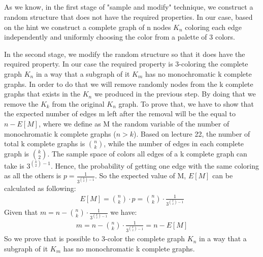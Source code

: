 \documentclass[11pt]{537homework}
\begin{document}
\subsection{} 
As we know, in the first stage of "sample and modify" technique, we construct a random structure that does not have the required properties. In our case, based on the hint we construct a complete graph of n nodes $K_n$ coloring each edge independently and uniformly choosing the color from a palette of 3 colors. 
\par In the second stage, we modify the random structure so that it does have the required property. In our case the required property is 3-coloring the complete graph $K_n$ in a way that a subgraph of it $K_m$ has no monochromatic k complete graphs. In order to do that we will remove randomly nodes from the k complete graphs that exists in the $K_n$ we produced in the previous step. By doing that we remove the $K_k$ from the original $K_n$ graph. To prove that, we have to show that the expected number of edges m left after the removal will be the equal to  $n - E[M]$, where we define as M the random variable of the number of monochromatic k complete graphs ($n>k$). Based on lecture 22, the number of total k complete graphs is ${n \choose k}$, while the number of edges in each complete graph is ${k \choose 2}$. The sample space of colors all edges of a k complete graph can take is $3^{{k \choose 2} - 1}$. Hence, the probability of getting one edge with the same coloring as all the others is $p = \frac{1}{3^{{k \choose 2} - 1}}$. So the expected value of M, $E[M]$ can be calculated as following:
\begin{align*}
    E[M] = {n \choose k} \cdot p = {n \choose k} \cdot \frac{1}{3^{{k \choose 2} - 1}}
\end{align*}
Given that $m = n - {n \choose k} \cdot \frac{1}{3^{{k \choose 2} - 1}}$ we have:
\begin{align*}
    m = n - {n \choose k} \cdot \frac{1}{3^{{k \choose 2} - 1}} = n - E[M]
\end{align*}
So we prove that is possible to 3-color the complete graph $K_n$ in a way that a subgraph of it $K_m$ has no monochromatic k complete graphs.
\end{document}
